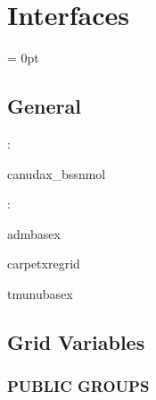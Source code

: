 
\section{Interfaces} 


\parskip = 0pt

\vspace{3mm} \subsection*{General}

: 

canudax\_bssnmol
\vspace{2mm}

: 

admbasex

carpetxregrid

tmunubasex
\vspace{2mm}
\subsection*{Grid Variables}
\vspace{5mm}\subsubsection{PUBLIC GROUPS}

\vspace{5mm}


